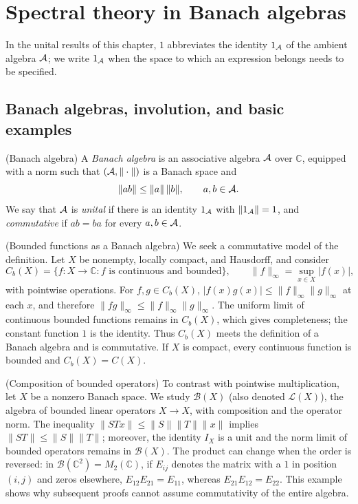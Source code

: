 \chapter{Spectral theory in Banach algebras}

In the unital results of this chapter, $1$ abbreviates the identity $1_\mathcal A$ of
the ambient algebra $\mathcal A$; we write $1_\mathcal A$ when the space to which an expression
belongs needs to be specified.

\section{Banach algebras, involution, and basic examples}

\begin{cthdefinicion}{(Banach algebra)}
A \emph{Banach algebra} is an associative algebra $\mathcal A$ over $\mathbb C$, equipped with a
norm such that $(\mathcal A,\|\cdot\|)$ is a Banach space and
\[
  \|ab\|\le \|a\|\,\|b\|,\qquad a,b\in\mathcal A.
\]
We say that $\mathcal A$ is \emph{unital} if there is an identity $1_\mathcal A$ with $\|1_\mathcal A\|=1$, and \emph{commutative} if
$ab=ba$ for every $a,b\in\mathcal A$.
\end{cthdefinicion}

\begin{cthejemplo}{(Bounded functions as a Banach algebra)}
We seek a commutative model of the definition. Let $X$ be nonempty,
locally compact, and Hausdorff, and consider
\[
 C_b(X)=\{f:X\to\mathbb C: f\text{ is continuous and bounded}\},\qquad
 \|f\|_\infty=\sup_{x\in X}|f(x)|,
\]
with pointwise operations. For $f,g\in C_b(X)$,
$|f(x)g(x)|\le\|f\|_\infty\|g\|_\infty$ at each $x$, and therefore
$\|fg\|_\infty\le\|f\|_\infty\|g\|_\infty$.
The uniform limit of continuous bounded functions remains in $C_b(X)$,
which gives completeness; the constant function $1$ is the identity.
Thus $C_b(X)$ meets the definition of a Banach algebra and is commutative.
If $X$ is compact, every continuous function is bounded and $C_b(X)=C(X)$.
\end{cthejemplo}

\begin{cthejemplo}{(Composition of bounded operators)}
To contrast with pointwise multiplication, let $X$ be a nonzero Banach space.
We study $\mathcal B(X)$ (also denoted $\mathcal L(X)$), the algebra
of bounded linear operators $X\to X$, with composition and the operator
norm. The inequality $\|STx\|\le\|S\|\|T\|\|x\|$ implies
$\|ST\|\le\|S\|\|T\|$; moreover, the identity $I_X$ is a unit and
the norm limit of bounded operators remains in $\mathcal B(X)$.
The product can change when the order is reversed: in
$\mathcal B(\mathbb C^2)=M_2(\mathbb C)$, if $E_{ij}$ denotes the matrix
with a $1$ in position $(i,j)$ and zeros elsewhere,
$E_{12}E_{21}=E_{11}$, whereas $E_{21}E_{12}=E_{22}$.
This example shows why subsequent proofs cannot assume
commutativity of the entire algebra.
\end{cthejemplo}

